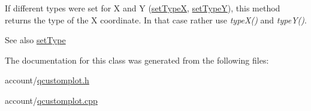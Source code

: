 \-If different types were set for \-X and \-Y (\hyperlink{classQCPItemPosition_a2113b2351d6d00457fb3559a4e20c3ea}{set\-Type\-X}, \hyperlink{classQCPItemPosition_ac2a454aa5a54c1615c50686601ec4510}{set\-Type\-Y}), this method returns the type of the \-X coordinate. \-In that case rather use {\itshape type\-X()\/} and {\itshape type\-Y()\/}.

\begin{DoxySeeAlso}{\-See also}
\hyperlink{classQCPItemPosition_aa476abf71ed8fa4c537457ebb1a754ad}{set\-Type} 
\end{DoxySeeAlso}


\-The documentation for this class was generated from the following files\-:\begin{DoxyCompactItemize}
\item 
account/\hyperlink{qcustomplot_8h}{qcustomplot.\-h}\item 
account/\hyperlink{qcustomplot_8cpp}{qcustomplot.\-cpp}\end{DoxyCompactItemize}
